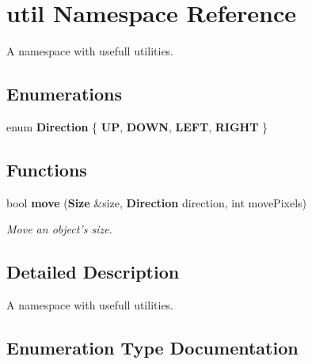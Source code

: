 \section{util Namespace Reference}
\label{namespaceutil}


A namespace with usefull utilities.  


\subsection*{Enumerations}
\begin{DoxyCompactItemize}
\item 
enum {\bf Direction} \{ {\bf U\-P}, 
{\bf D\-O\-W\-N}, 
{\bf L\-E\-F\-T}, 
{\bf R\-I\-G\-H\-T}
 \}
\end{DoxyCompactItemize}
\subsection*{Functions}
\begin{DoxyCompactItemize}
\item 
bool {\bf move} ({\bf Size} \&size, {\bf Direction} direction, int move\-Pixels)
\begin{DoxyCompactList}\small\item\em Move an object's size. \end{DoxyCompactList}\end{DoxyCompactItemize}


\subsection{Detailed Description}
A namespace with usefull utilities. 

\subsection{Enumeration Type Documentation}
